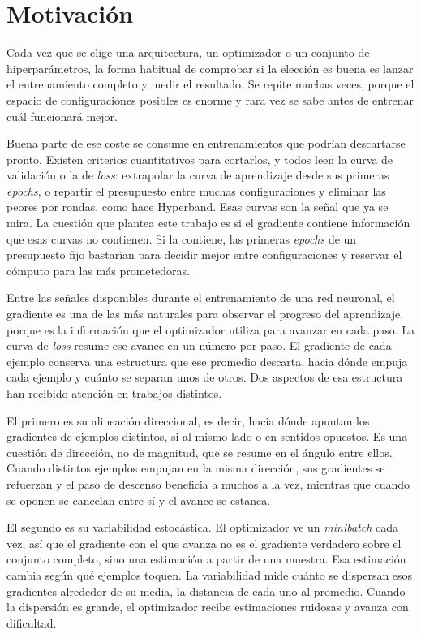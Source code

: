\section{Motivación}
\label{sec:motivacion}

Cada vez que se elige una arquitectura, un optimizador o un conjunto de hiperparámetros, la forma habitual de comprobar si la elección es buena es lanzar el entrenamiento completo y medir el resultado. Se repite muchas veces, porque el espacio de configuraciones posibles es enorme y rara vez se sabe antes de entrenar cuál funcionará mejor.

Buena parte de ese coste se consume en entrenamientos que podrían descartarse pronto. Existen criterios cuantitativos para cortarlos, y todos leen la curva de validación o la de \emph{loss}: extrapolar la curva de aprendizaje desde sus primeras \emph{epochs}, o repartir el presupuesto entre muchas configuraciones y eliminar las peores por rondas, como hace Hyperband. Esas curvas son la señal que ya se mira. La cuestión que plantea este trabajo es si el gradiente contiene información que esas curvas no contienen. Si la contiene, las primeras \emph{epochs} de un presupuesto fijo bastarían para decidir mejor entre configuraciones y reservar el cómputo para las más prometedoras.

Entre las señales disponibles durante el entrenamiento de una red neuronal, el gradiente es una de las más naturales para observar el progreso del aprendizaje, porque es la información que el optimizador utiliza para avanzar en cada paso. La curva de \emph{loss} resume ese avance en un número por paso. El gradiente de cada ejemplo conserva una estructura que ese promedio descarta, hacia dónde empuja cada ejemplo y cuánto se separan unos de otros. Dos aspectos de esa estructura han recibido atención en trabajos distintos.

El primero es su alineación direccional, es decir, hacia dónde apuntan los gradientes de ejemplos distintos, si al mismo lado o en sentidos opuestos. Es una cuestión de dirección, no de magnitud, que se resume en el ángulo entre ellos. Cuando distintos ejemplos empujan en la misma dirección, sus gradientes se refuerzan y el paso de descenso beneficia a muchos a la vez, mientras que cuando se oponen se cancelan entre sí y el avance se estanca.

El segundo es su variabilidad estocástica. El optimizador ve un \emph{minibatch} cada vez, así que el gradiente con el que avanza no es el gradiente verdadero sobre el conjunto completo, sino una estimación a partir de una muestra. Esa estimación cambia según qué ejemplos toquen. La variabilidad mide cuánto se dispersan esos gradientes alrededor de su media, la distancia de cada uno al promedio. Cuando la dispersión es grande, el optimizador recibe estimaciones ruidosas y avanza con dificultad.

